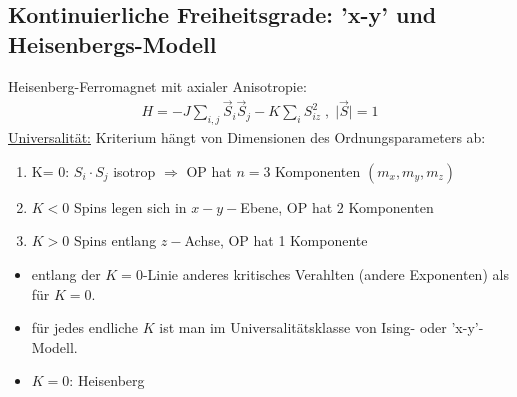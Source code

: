 \documentclass[12pt]{article}
\begin{document}
 \subsection{Kontinuierliche Freiheitsgrade: 'x-y' und Heisenbergs-Modell} \label{Kapitel2.9}
 Heisenberg-Ferromagnet mit axialer Anisotropie: 
 \begin{align}
 H= - J \sum_{i,j} \vec{S}_i \vec{S}_j - K \sum_i S_{iz}^2 \; , \; \vert \vec{S} \vert
 =1
 \end{align}
 \underline{Universalität:} Kriterium hängt von Dimensionen des Ordnungsparameters ab:
 \begin{enumerate}
 \item K= 0: $S_i \cdot S_j$ isotrop $\Rightarrow$ OP hat $n=3$ Komponenten $(m_x, m_y, m_z)$
 \item $K<0$ Spins legen sich in $x-y-$Ebene, OP hat $2$ Komponenten
 \item $K>0$ Spins entlang $z-$Achse, OP hat 1 Komponente
 \end{enumerate}
 \begin{itemize}
 \item entlang der $K=0$-Linie anderes kritisches Verahlten (andere Exponenten) als für $K=0$.
 \item für jedes endliche $K$ ist man im Universalitätsklasse von Ising- oder 'x-y'-Modell. 
 \item $K=0$: Heisenberg
 \end{itemize}

\end{document}
